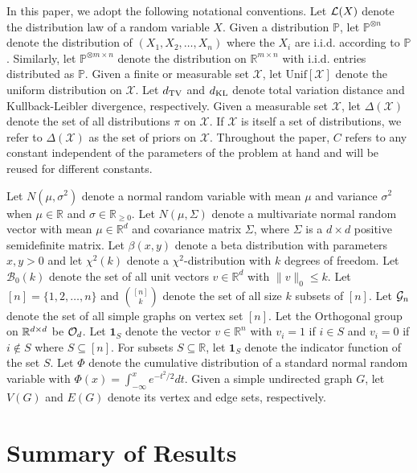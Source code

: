 \documentclass[11pt]{article}
\begin{document}
In this paper, we adopt the following notational conventions. Let $\mathcal{L}(X)$ denote the distribution law of a random variable $X$. Given a distribution $\mathbb{P}$, let $\mathbb{P}^{\otimes n}$ denote the distribution of $(X_1, X_2, \dots, X_n)$ where the $X_i$ are i.i.d. according to $\mathbb{P}$. Similarly, let $\mathbb{P}^{\otimes m \times n}$ denote the distribution on $\mathbb{R}^{m \times n}$ with i.i.d. entries distributed as $\mathbb{P}$. Given a finite or measurable set $\mathcal{X}$, let $\text{Unif}[\mathcal{X}]$ denote the uniform distribution on $\mathcal{X}$. Let $d_{\text{TV}}$ and $d_{\text{KL}}$ denote total variation distance and Kullback-Leibler divergence, respectively. Given a measurable set $\mathcal{X}$, let $\Delta(\mathcal{X})$ denote the set of all distributions $\pi$ on $\mathcal{X}$. If $\mathcal{X}$ is itself a set of distributions, we refer to $\Delta(\mathcal{X})$ as the set of priors on $\mathcal{X}$. Throughout the paper, $C$ refers to any constant independent of the parameters of the problem at hand and will be reused for different constants.

Let $N(\mu, \sigma^2)$ denote a normal random variable with mean $\mu$ and variance $\sigma^2$ when $\mu \in \mathbb{R}$ and $\sigma \in \mathbb{R}_{\ge 0}$. Let $N(\mu, \Sigma)$ denote a multivariate normal random vector with mean $\mu \in \mathbb{R}^d$ and covariance matrix $\Sigma$, where $\Sigma$ is a $d \times d$ positive semidefinite matrix. Let $\beta(x, y)$ denote a beta distribution with parameters $x, y > 0$ and let $\chi^2(k)$ denote a $\chi^2$-distribution with $k$ degrees of freedom. Let $\mathcal{B}_0(k)$ denote the set of all unit vectors $v \in \mathbb{R}^d$ with $\| v \|_0 \le k$. Let $[n] = \{1, 2, \dots, n\}$ and $\binom{[n]}{k}$ denote the set of all size $k$ subsets of $[n]$. Let $\mathcal{G}_n$ denote the set of all simple graphs on vertex set $[n]$. Let the Orthogonal group on $\mathbb{R}^{d \times d}$ be $\mathcal{O}_d$. Let $\mathbf{1}_S$ denote the vector $v \in \mathbb{R}^n$ with $v_i = 1$ if $i \in S$ and $v_i = 0$ if $i \not \in S$ where $S \subseteq [n]$. For subsets $S \subseteq \mathbb{R}$, let $\mathbf{1}_S$ denote the indicator function of the set $S$. Let $\Phi$ denote the cumulative distribution of a standard normal random variable with $\Phi(x) = \int_{-\infty}^x e^{-t^2/2} dt$. Given a simple undirected graph $G$, let $V(G)$ and $E(G)$ denote its vertex and edge sets, respectively.

\section{Summary of Results}
\end{document}
